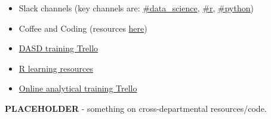 \documentclass[]{book}
\providecommand{\tightlist}{%
  \setlength{\itemsep}{0pt}\setlength{\parskip}{0pt}}
\begin{document}
\begin{itemize}
\tightlist
\item
  Slack channels (key channels are: \href{https://app.slack.com/client/T1PU1AP6D/C1Z8Q18LS}{\#data\_science}, \href{https://app.slack.com/client/T1PU1AP6D/C1PUCG719}{\#r}, \href{https://app.slack.com/client/T1PU1AP6D/C1Q09V86S}{\#python})\\
\item
  Coffee and Coding (resources \href{https://github.com/moj-analytical-services/Coffee-and-Coding}{here})\\
\item
  \href{https://trello.com/b/zAwm6sCc/dasd-training}{DASD training Trello}\\
\item
  \href{https://docs.google.com/document/d/1R4hBMf26T9HEnCdVz56PpZhwiCv5RhberYL3BxOSKsA/edit}{R learning resources}\\
\item
  \href{https://trello.com/b/D5pSkqnT/online-analytical-training}{Online analytical training Trello}
\end{itemize}

\textbf{PLACEHOLDER} - something on cross-departmental resources/code.
\end{document}
